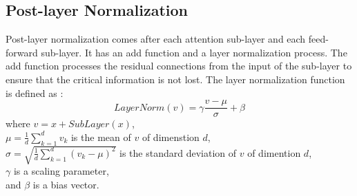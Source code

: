 \subsection{Post-layer Normalization}
Post-layer normalization comes after each attention sub-layer and each feed-forward sub-layer. It has an add function and a layer normalization process. The add function processes the residual connections from the input of the sub-layer to ensure that the critical information is not lost. The layer normalization function is defined as \cite{rothman2021transformers}:
\begin{equation}
\label{eq:2.8}
LayerNorm(v) = \gamma{\frac{v-\mu}{\sigma}} + \beta
\end{equation}
where $v = x + SubLayer(x)$, \\ \medskip
\hspace*{10mm} $\displaystyle \mu = \frac{1}{d} \sum_{k = 1}^{d}v_k$ is the mean of $v$ of dimenstion $d$, \\ \medskip
\hspace*{10mm} $\displaystyle \sigma = \sqrt{\frac{1}{d} \sum_{k = 1}^{d}(v_k-\mu)^2}$ is the standard deviation of $v$ of dimention $d$, \\ \medskip
\hspace*{10mm} $\gamma$ is a scaling parameter, \\
\hspace*{10mm} and $\beta$ is a bias vector.

